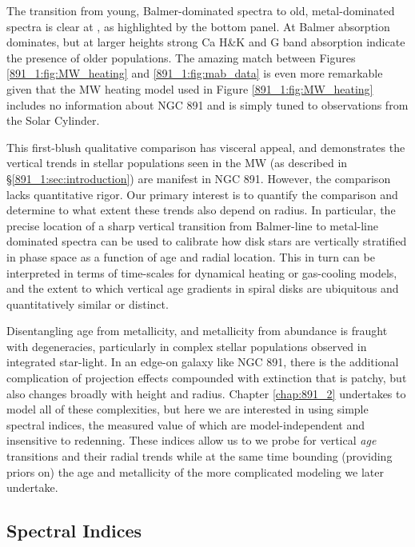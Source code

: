 
The transition from young, Balmer-dominated spectra to old,
metal-dominated spectra is clear at , as highlighted by
the bottom panel. At  Balmer absorption dominates, but at
larger heights strong Ca H\&K and G band absorption indicate the
presence of older populations.  The amazing match between Figures
\ref{891_1:fig:MW_heating} and \ref{891_1:fig:mab_data} is even more
remarkable given that the MW heating model used in Figure
\ref{891_1:fig:MW_heating} includes no information about NGC 891 and
is simply tuned to observations from the Solar Cylinder.

This first-blush qualitative comparison has visceral appeal, and
demonstrates the vertical trends in stellar populations seen in the MW
(as described in \S\ref{891_1:sec:introduction}) are manifest in NGC
891. However, the comparison lacks quantitative rigor.  Our primary
interest is to quantify the comparison and determine to what extent
these trends also depend on radius. In particular, the precise
location of a sharp vertical transition from Balmer-line to metal-line
dominated spectra can be used to calibrate how disk stars are
vertically stratified in phase space as a function of age and radial
location. This in turn can be interpreted in terms of time-scales for
dynamical heating or gas-cooling models, and the extent to which
vertical age gradients in spiral disks are ubiquitous and
quantitatively similar or distinct.

Disentangling age from metallicity, and metallicity from abundance is
fraught with degeneracies, particularly in complex stellar populations
observed in integrated star-light. In an edge-on galaxy like NGC 891,
there is the additional complication of projection effects compounded
with extinction that is patchy, but also changes broadly with height
and radius. Chapter \ref{chap:891_2} undertakes to model all of these
complexities, but here we are interested in using simple spectral
indices, the measured value of which are model-independent and
insensitive to redenning. These indices allow us to we probe for
vertical {\it age} transitions and their radial trends while at the
same time bounding (providing priors on) the age and metallicity of
the more complicated modeling we later undertake.

\subsection{Spectral Indices}
\label{891_1:sec:indices}


